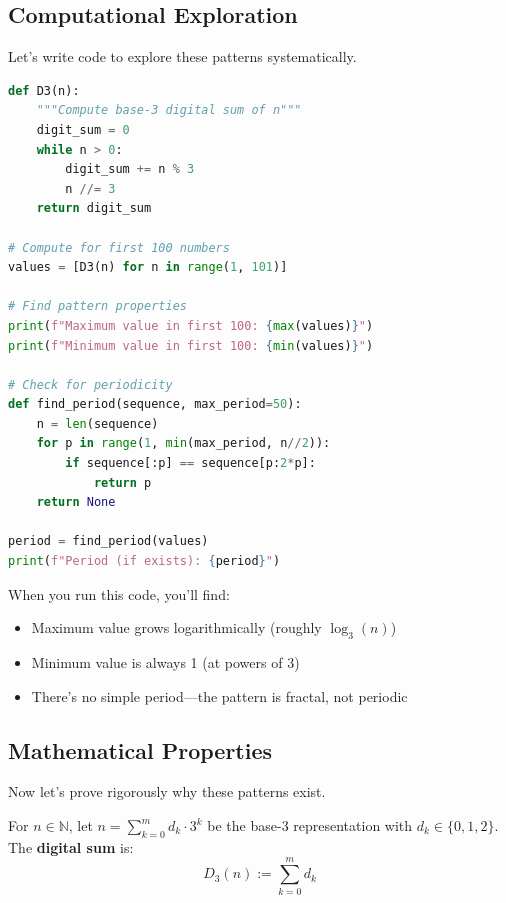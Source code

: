 \subsection{Computational Exploration}
\label{subsec:computational-exploration}

Let's write code to explore these patterns systematically.

\begin{lstlisting}[language=Python, caption=Computing $D_3(n)$ efficiently]
def D3(n):
    """Compute base-3 digital sum of n"""
    digit_sum = 0
    while n > 0:
        digit_sum += n % 3
        n //= 3
    return digit_sum

# Compute for first 100 numbers
values = [D3(n) for n in range(1, 101)]

# Find pattern properties
print(f"Maximum value in first 100: {max(values)}")
print(f"Minimum value in first 100: {min(values)}")

# Check for periodicity
def find_period(sequence, max_period=50):
    n = len(sequence)
    for p in range(1, min(max_period, n//2)):
        if sequence[:p] == sequence[p:2*p]:
            return p
    return None

period = find_period(values)
print(f"Period (if exists): {period}")
\end{lstlisting}

\begin{example}
When you run this code, you'll find:
\begin{itemize}
\item Maximum value grows logarithmically (roughly $\log_3(n)$)
\item Minimum value is always 1 (at powers of 3)
\item There's no simple period—the pattern is fractal, not periodic
\end{itemize}
\end{example}


\subsection{Mathematical Properties}
\label{subsec:mathematical-properties}

Now let's prove rigorously why these patterns exist.

\begin{definition}
For $n \in \mathbb{N}$, let $n = \sum_{k=0}^{m} d_k \cdot 3^k$ be the base-3 representation with $d_k \in \{0,1,2\}$. The \textbf{digital sum} is:
$$D_3(n) := \sum_{k=0}^{m} d_k$$
\end{definition}

